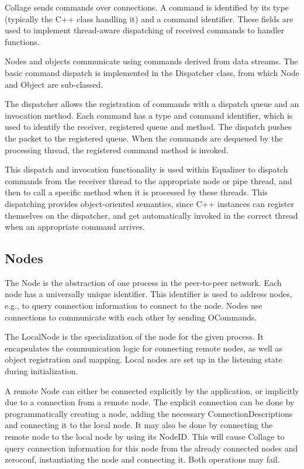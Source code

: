 Collage sends commands over connections. A command is identified by its type
(typically the C++ class handling it) and a command identifier. These fields
are used to implement thread-aware dispatching of received commands to handler
functions.

Nodes and objects communicate using commands derived from data streams. The
basic command dispatch is implemented in the \textsf{Dispatcher} class, from
which \textsf{Node} and \textsf{Object} are sub-classed.

The dispatcher allows the registration of commands with a dispatch queue and an
invocation method. Each command has a type and command identifier, which is
used to identify the receiver, registered queue and method. The dispatch pushes
the packet to the registered queue. When the commands are dequeued by the
processing thread, the registered command method is invoked.

This dispatch and invocation functionality is used within Equalizer to dispatch
commands from the receiver thread to the appropriate node or pipe thread, and
then to call a specific method when it is processed by these threads. This
dispatching provides object-oriented semantics, since C++ instances can
register themselves on the dispatcher, and get automatically invoked in the
correct thread when an appropriate command arrives.

\subsection{Nodes}

The \textsf{Node} is the abstraction of one process in the peer-to-peer network.
Each node has a universally unique identifier. This identifier is used to
address nodes, e.g., to query connection information to connect to the node.
Nodes use connections to communicate with each other by sending
\textsf{OCommand}s.

The \textsf{LocalNode} is the specialization of the node for the given process.
It encapsulates the communication logic for connecting remote nodes, as well as
object registration and mapping. Local nodes are set up in the listening state
during initialization.

A remote \textsf{Node} can either be connected explicitly by the application,
or implicitly due to a connection from a remote node. The explicit connection
can be done by programmatically creating a node, adding the necessary
\textsf{ConnectionDescription}s and connecting it to the local node. It may
also be done by connecting the remote node to the local node by using its
\textsf{NodeID}. This will cause Collage to query connection information for
this node from the already connected nodes and zeroconf, instantiating the node
and connecting it. Both operations may fail.

